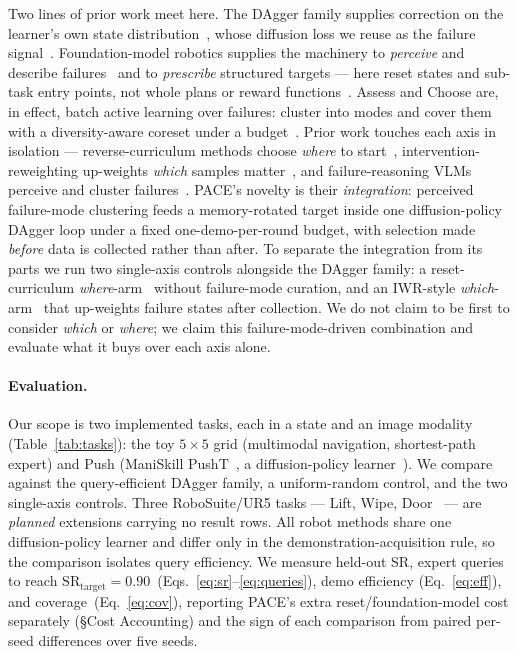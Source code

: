 \documentclass[letterpaper]{article} %
\begin{document}
Two lines of prior work meet here. The DAgger family supplies correction on the
learner's own state distribution~\citep{ross2011dagger,laskey2017dart}, whose
diffusion loss we reuse as the failure signal~\citep{lee2025diffdagger}.
Foundation-model robotics supplies the machinery to \emph{perceive} and describe
failures~\citep{liu2023reflect,duan2025aha,shinn2023reflexion} and to
\emph{prescribe} structured targets --- here reset states and sub-task entry
points, not whole plans or reward functions~\citep{liang2023codeaspolicies,
ma2024eureka,yu2023language2rewards,florensa2017reversecurriculum,
eysenbach2018leavenotrace}. Assess and Choose are, in effect, batch active
learning over failures: cluster into modes and cover them with a diversity-aware
coreset under a budget~\citep{settles2009active,ash2020badge,sener2018coreset}.
Prior work touches each axis in isolation --- reverse-curriculum methods choose
\emph{where} to start~\citep{florensa2017reversecurriculum,eysenbach2018leavenotrace},
intervention-reweighting up-weights \emph{which} samples
matter~\citep{mandlekar2020iwr,liu2023sirius}, and failure-reasoning VLMs perceive
and cluster failures~\citep{liu2023reflect,duan2025aha}. PACE's novelty is their
\emph{integration}: perceived failure-mode clustering feeds a memory-rotated
target inside one diffusion-policy DAgger loop under a fixed one-demo-per-round
budget, with selection made \emph{before} data is collected rather than after. To
separate the integration from its parts we run two single-axis controls alongside
the DAgger family: a reset-curriculum \emph{where}-arm~\citep{florensa2017reversecurriculum}
without failure-mode curation, and an IWR-style \emph{which}-arm~\citep{mandlekar2020iwr}
that up-weights failure states after collection. We do not claim to be first to
consider \emph{which} or \emph{where}; we claim this failure-mode-driven
combination and evaluate what it buys over each axis alone.

\paragraph{Evaluation.}
Our scope is two implemented tasks, each in a state and an image modality
(Table~\ref{tab:tasks}): the toy $5{\times}5$ grid (multimodal navigation,
shortest-path expert) and Push (ManiSkill
PushT~\citep{mu2021maniskill,tao2024maniskill3,florence2021implicitbc}, a
diffusion-policy learner~\citep{chi2023diffusionpolicy,ho2020ddpm}). We compare
against the query-efficient DAgger family, a uniform-random control, and the two
single-axis controls. Three RoboSuite/UR5 tasks --- Lift, Wipe,
Door~\citep{zhu2020robosuite,mandlekar2021robomimic} --- are \emph{planned}
extensions carrying no result rows. All robot methods share one diffusion-policy
learner and differ only in the demonstration-acquisition rule, so the comparison
isolates query efficiency. We measure held-out SR, expert queries to reach
$\mathrm{SR}_{\mathrm{target}}{=}0.90$~(Eqs.~\ref{eq:sr}--\ref{eq:queries}), demo
efficiency (Eq.~\ref{eq:eff}), and coverage~(Eq.~\ref{eq:cov}), reporting PACE's
extra reset/foundation-model cost separately (\S Cost Accounting) and the sign of
each comparison from paired per-seed differences over five seeds.
\end{document}
